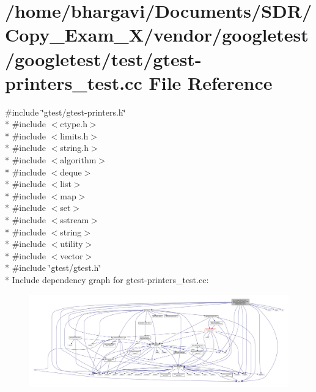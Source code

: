 \hypertarget{gtest-printers__test_8cc}{}\section{/home/bhargavi/\+Documents/\+S\+D\+R/\+Copy\+\_\+\+Exam\+\_\+X/vendor/googletest/googletest/test/gtest-\/printers\+\_\+test.cc File Reference}
\label{gtest-printers__test_8cc}
{\ttfamily \#include \char`\"{}gtest/gtest-\/printers.\+h\char`\"{}}\\*
{\ttfamily \#include $<$ctype.\+h$>$}\\*
{\ttfamily \#include $<$limits.\+h$>$}\\*
{\ttfamily \#include $<$string.\+h$>$}\\*
{\ttfamily \#include $<$algorithm$>$}\\*
{\ttfamily \#include $<$deque$>$}\\*
{\ttfamily \#include $<$list$>$}\\*
{\ttfamily \#include $<$map$>$}\\*
{\ttfamily \#include $<$set$>$}\\*
{\ttfamily \#include $<$sstream$>$}\\*
{\ttfamily \#include $<$string$>$}\\*
{\ttfamily \#include $<$utility$>$}\\*
{\ttfamily \#include $<$vector$>$}\\*
{\ttfamily \#include \char`\"{}gtest/gtest.\+h\char`\"{}}\\*
Include dependency graph for gtest-\/printers\+\_\+test.cc\+:
\nopagebreak
\begin{figure}[H]
\begin{center}
\leavevmode
\includegraphics[width=350pt]{gtest-printers__test_8cc__incl}
\end{center}
\end{figure}
